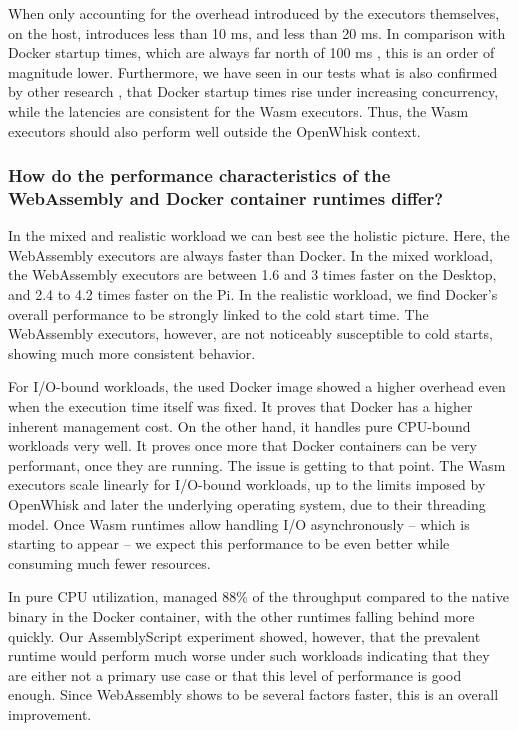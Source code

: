 When only accounting for the overhead introduced by the executors themselves, on the  host,  introduces less than 10 ms, and  less than 20 ms. In comparison with Docker startup times, which are always far north of 100 ms \cite{Wang2018, Manner2018}, this is an order of magnitude lower. Furthermore, we have seen in our tests what is also confirmed by other research \cite{Mohan2019}, that Docker startup times rise under increasing concurrency, while the latencies are consistent for the Wasm executors. Thus, the Wasm executors should also perform well outside the OpenWhisk context.

\subsubsection*{How do the performance characteristics of the WebAssembly and Docker container runtimes differ?}

In the mixed and realistic workload we can best see the holistic picture. Here, the WebAssembly executors are always faster than Docker. In the mixed workload, the WebAssembly executors are between 1.6 and 3 times faster on the Desktop, and 2.4 to 4.2 times faster on the Pi. In the realistic workload, we find Docker's overall performance to be strongly linked to the cold start time. The WebAssembly executors, however, are not noticeably susceptible to cold starts, showing much more consistent behavior.

For I/O-bound workloads, the used Docker image showed a higher overhead even when the execution time itself was fixed. It proves that Docker has a higher inherent management cost. On the other hand, it handles pure CPU-bound workloads very well. It proves once more that Docker containers can be very performant, once they are running. The issue is getting to that point.
The Wasm executors scale linearly for I/O-bound workloads, up to the limits imposed by OpenWhisk and later the underlying operating system, due to their threading model. Once Wasm runtimes allow handling I/O asynchronously -- which is starting to appear -- we expect this performance to be even better while consuming much fewer resources.

In pure CPU utilization,  managed 88\% of the throughput compared to the native binary in the Docker container, with the other runtimes falling behind more quickly. Our AssemblyScript experiment showed, however, that the prevalent  runtime would perform much worse under such workloads indicating that they are either not a primary use case or that this level of performance is good enough. Since WebAssembly shows to be several factors faster, this is an overall improvement.

